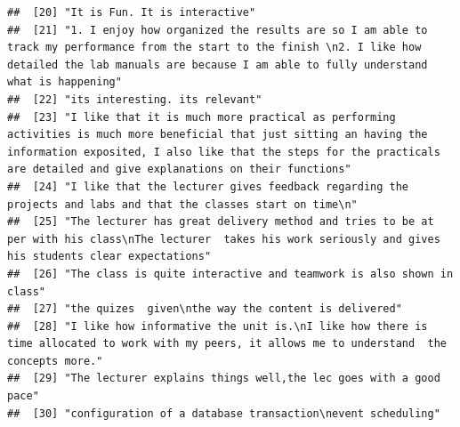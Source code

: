 \documentclass[
]{article}
\begin{document}
\begin{verbatim}
##  [20] "It is Fun. It is interactive"                                                                                                                                                                                                                     
##  [21] "1. I enjoy how organized the results are so I am able to track my performance from the start to the finish \n2. I like how detailed the lab manuals are because I am able to fully understand what is happening"                                  
##  [22] "its interesting. its relevant"                                                                                                                                                                                                                    
##  [23] "I like that it is much more practical as performing activities is much more beneficial that just sitting an having the information exposited, I also like that the steps for the practicals are detailed and give explanations on their functions"
##  [24] "I like that the lecturer gives feedback regarding the projects and labs and that the classes start on time\n"                                                                                                                                     
##  [25] "The lecturer has great delivery method and tries to be at per with his class\nThe lecturer  takes his work seriously and gives his students clear expectations"                                                                                   
##  [26] "The class is quite interactive and teamwork is also shown in class"                                                                                                                                                                               
##  [27] "the quizes  given\nthe way the content is delivered"                                                                                                                                                                                              
##  [28] "I like how informative the unit is.\nI like how there is time allocated to work with my peers, it allows me to understand  the concepts more."                                                                                                    
##  [29] "The lecturer explains things well,the lec goes with a good pace"                                                                                                                                                                                  
##  [30] "configuration of a database transaction\nevent scheduling"                                                                                                                                                                                        

\end{verbatim}
\end{document}
